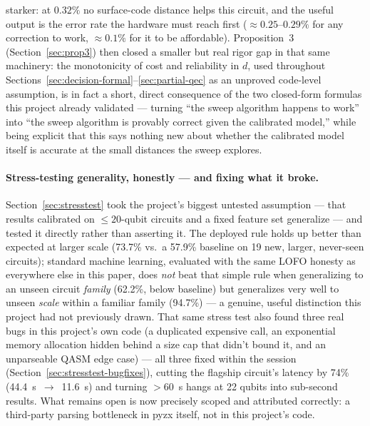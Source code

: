 \documentclass[9pt,twocolumn]{extarticle}
\begin{document}
starker: at $0.32\%$ no surface-code distance helps this circuit, and the
useful output is the error rate the hardware must reach first ($\approx0.25$--$0.29\%$
for any correction to work, $\approx0.1\%$ for it to be affordable). Proposition~3
(Section~\ref{sec:prop3}) then closed a smaller but real rigor gap in
that same machinery: the monotonicity of cost and reliability in $d$,
used throughout Sections~\ref{sec:decision-formal}--\ref{sec:partial-qec}
as an unproved code-level assumption, is in fact a short, direct
consequence of the two closed-form formulas this project already
validated --- turning ``the sweep algorithm happens to work'' into ``the
sweep algorithm is provably correct given the calibrated model,'' while
being explicit that this says nothing new about whether the calibrated
model itself is accurate at the small distances the sweep explores.

\paragraph{Stress-testing generality, honestly --- and fixing what it broke.}
Section~\ref{sec:stresstest} took the project's biggest untested
assumption --- that results calibrated on $\leq\!20$-qubit circuits and a
fixed feature set generalize --- and tested it directly rather than
asserting it. The deployed rule holds up better than expected at larger
scale (73.7\% vs.\ a 57.9\% baseline on 19 new, larger, never-seen
circuits); standard machine learning, evaluated with the same LOFO honesty
as everywhere else in this paper, does \emph{not} beat that simple rule
when generalizing to an unseen circuit \emph{family} (62.2\%, below
baseline) but generalizes very well to unseen \emph{scale} within a
familiar family (94.7\%) --- a genuine, useful distinction this project
had not previously drawn. That same stress test also found three real bugs
in this project's own code (a duplicated expensive call, an exponential
memory allocation hidden behind a size cap that didn't bound it, and an
unparseable QASM edge case) --- all three fixed within the session
(Section~\ref{sec:stresstest-bugfixes}), cutting the flagship circuit's
latency by 74\% (44.4~s~$\to$~11.6~s) and turning $>$60~s hangs at 22
qubits into sub-second results. What remains open is now precisely scoped
and attributed correctly: a third-party parsing bottleneck in pyzx itself,
not in this project's code.
\end{document}
